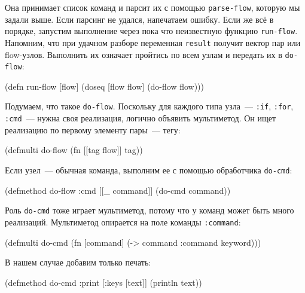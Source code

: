 Она принимает список команд и парсит их с помощью \texttt{parse-flow}, которую
мы задали выше. Если парсинг не удался, напечатаем ошибку. Если же всё в
порядке, запустим выполнение через пока что неизвестную функцию
\texttt{run-flow}. Напомним, что при удачном разборе переменная \texttt{result}
получит вектор пар или flow-узлов. Выполнить их означает пройтись по всем узлам
и передать их в \texttt{do-flow}:

\begin{english}
  \begin{clojure}
(defn run-flow [flow]
  (doseq [flow flow]
    (do-flow flow)))
  \end{clojure}
\end{english}

Подумаем, что такое \texttt{do-flow}. Поскольку для каждого типа узла~---
\verb|:if|, \verb|:for|, \verb|:cmd|~--- нужна своя реализация, логично объявить
мультиметод. Он ищет реализацию по первому элементу пары~--- тегу:

\begin{english}
  \begin{clojure}
(defmulti do-flow
  (fn [[tag flow]]
    tag))
  \end{clojure}
\end{english}

Если узел~--- обычная команда, выполним ее с помощью обработчика \texttt{do-cmd}:

\begin{english}
  \begin{clojure}
(defmethod do-flow :cmd
  [[_ command]]
  (do-cmd command))
  \end{clojure}
\end{english}

Роль \texttt{do-cmd} тоже играет мультиметод, потому что у команд может быть
много реализаций. Мультиметод опирается на поле команды \texttt{:command}:

\begin{english}
  \begin{clojure}
(defmulti do-cmd
  (fn [command]
    (-> command :command keyword)))
  \end{clojure}
\end{english}

\noindent
В нашем случае добавим только печать:

\begin{english}
  \begin{clojure}
(defmethod do-cmd :print
  [{:keys [text]}]
  (println text))
  \end{clojure}
\end{english}

